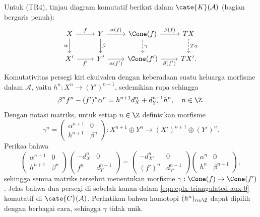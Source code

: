 \begin{bukti}
	Untuk (TR4), tinjau diagram komutatif berikut dalam
	$\cate{K}(\mathcal{A})$ (bagian bergaris penuh):
	\begin{equation}\label{eqn:cplx-triangulated-aux-0}\begin{tikzcd}
		X \arrow[d, "\alpha"'] \arrow[r, "f"] & Y \arrow[r, "\alpha(f)"] \arrow[d, "\beta"] & \Cone(f) \arrow[r, "\beta(f)"] \arrow[dashed, d, "\gamma"] & TX \arrow[dashed, d, "T\alpha"] \\
		X' \arrow[r, "{f'}"'] & Y' \arrow[r, "{\alpha(f')}"'] & \Cone(f') \arrow[r, "{\beta(f')}"'] & T X' .
	\end{tikzcd}\end{equation}
	Komutativitas persegi kiri ekuivalen dengan keberadaan suatu keluarga
	morfisme dalam $\mathcal{A}$, yaitu $h^n: X^n \to (Y')^{n-1}$, sedemikian
	rupa sehingga
	\[ \beta^n f^n - (f')^n \alpha^n = h^{n+1} d_X^n + d_{Y'}^{n-1} h^n , \quad n \in \Z . \]
	Dengan notasi matriks, untuk setiap $n \in \Z$ definisikan morfisme
	\[ \gamma^n = \begin{pmatrix} \alpha^{n+1} & 0 \\ h^{n+1} & \beta^n \end{pmatrix} : X^{n+1} \oplus Y^n \to (X')^{n+1} \oplus (Y')^n . \]
	Periksa bahwa
	\[ \begin{pmatrix} \alpha^{n+1} & 0 \\ h^{n+1} & \beta^n \end{pmatrix} \begin{pmatrix} -d_X^n & 0 \\ f^n & d_Y^{n-1} \end{pmatrix}
	= \begin{pmatrix} -d_{X'}^n & 0 \\ (f')^n & d_{Y'}^{n-1} \end{pmatrix} \begin{pmatrix} \alpha^n & 0 \\ h^n & \beta^{n-1} \end{pmatrix}, \]
	sehingga semua matriks tersebut menentukan morfisme
	$\gamma: \Cone(f) \to \Cone(f')$. Jelas bahwa dua persegi di sebelah kanan
	dalam \eqref{eqn:cplx-triangulated-aux-0} komutatif di
	$\cate{C}(\mathcal{A})$. Perhatikan bahwa homotopi $(h^n)_{n \in \Z}$ dapat
	dipilih dengan berbagai cara, sehingga $\gamma$ tidak unik.


\end{bukti}
